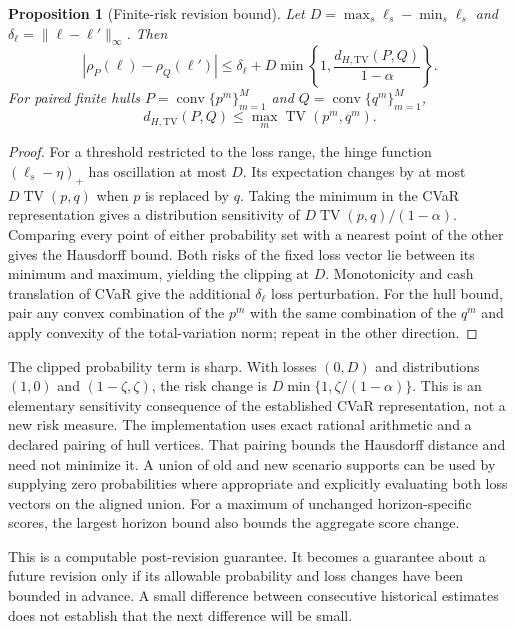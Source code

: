 \documentclass[11pt,a4paper]{article}
\newtheorem{proposition}[theorem]{Proposition}
\theoremstyle{definition}\newtheorem{definition}[theorem]{Definition}
\begin{document}
\begin{proposition}[Finite-risk revision bound]\label{prop:riskrevision}
Let $D=\max_s\ell_s-\min_s\ell_s$ and $\delta_\ell=\|\ell-\ell'\|_\infty$. Then
\begin{equation}
 |\rho_P(\ell)-\rho_Q(\ell')|
 \le \delta_\ell+D\min\left\{1,
 \frac{d_{H,\mathrm{TV}}(P,Q)}{1-\alpha}\right\}.
 \label{eq:riskrevisionbound}
\end{equation}
For paired finite hulls $P=\operatorname{conv}\{p^m\}_{m=1}^M$ and
$Q=\operatorname{conv}\{q^m\}_{m=1}^M$,
\begin{equation}
 d_{H,\mathrm{TV}}(P,Q)\le \max_m\operatorname{TV}(p^m,q^m).
 \label{eq:pairedtv}
\end{equation}
\end{proposition}
\begin{proof}
For a threshold restricted to the loss range, the hinge function
$(\ell_s-\eta)_+$ has oscillation at most $D$. Its expectation changes by at most
$D\operatorname{TV}(p,q)$ when $p$ is replaced by $q$. Taking the minimum in the
CVaR representation gives a distribution sensitivity of
$D\operatorname{TV}(p,q)/(1-\alpha)$. Comparing every point of either probability
set with a nearest point of the other gives the Hausdorff bound. Both risks of
the fixed loss vector lie between its minimum and maximum, yielding the clipping
at $D$. Monotonicity and cash translation of CVaR give the additional
$\delta_\ell$ loss perturbation. For the hull bound, pair any convex combination
of the $p^m$ with the same combination of the $q^m$ and apply convexity of the
total-variation norm; repeat in the other direction.
\end{proof}

The clipped probability term is sharp. With losses $(0,D)$ and distributions
$(1,0)$ and $(1-\zeta,\zeta)$, the risk change is
$D\min\{1,\zeta/(1-\alpha)\}$. This is an elementary sensitivity consequence of
the established CVaR representation, not a new risk measure. The implementation
uses exact rational arithmetic and a declared pairing of hull vertices. That
pairing bounds the Hausdorff distance and need not minimize it. A union of old
and new scenario supports can be used by supplying zero probabilities where
appropriate and explicitly evaluating both loss vectors on the aligned union.
For a maximum of unchanged horizon-specific scores, the largest horizon bound
also bounds the aggregate score change.

This is a computable post-revision guarantee. It becomes a guarantee about a
future revision only if its allowable probability and loss changes have been
bounded in advance. A small difference between consecutive historical estimates
does not establish that the next difference will be small.
\end{document}
